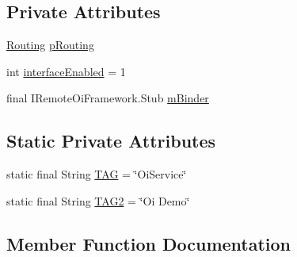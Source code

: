 \subsection*{Private Attributes}
\begin{DoxyCompactItemize}
\item 
\hyperlink{classcom_1_1copelabs_1_1oiframework_1_1router_1_1_routing}{Routing} \hyperlink{classcom_1_1copelabs_1_1oiframework_1_1contentmanager_1_1_content_manager_a15b9d671e7079dd1c471a4b6a331f3e8}{p\+Routing}
\item 
int \hyperlink{classcom_1_1copelabs_1_1oiframework_1_1contentmanager_1_1_content_manager_a804a8e78c97fca907d1752b0176a1a57}{interface\+Enabled} = 1
\item 
final I\+Remote\+Oi\+Framework.\+Stub \hyperlink{classcom_1_1copelabs_1_1oiframework_1_1contentmanager_1_1_content_manager_a530fa8b90c4758fdbad5f0973ea488e8}{m\+Binder}
\end{DoxyCompactItemize}
\subsection*{Static Private Attributes}
\begin{DoxyCompactItemize}
\item 
static final String \hyperlink{classcom_1_1copelabs_1_1oiframework_1_1contentmanager_1_1_content_manager_a5768346882b7f03d78b3e2e09ff482fa}{T\+A\+G} = \char`\"{}Oi\+Service\char`\"{}
\item 
static final String \hyperlink{classcom_1_1copelabs_1_1oiframework_1_1contentmanager_1_1_content_manager_a54253c268f02b62bf5db606859ab7b5b}{T\+A\+G2} = \char`\"{}Oi Demo\char`\"{}
\end{DoxyCompactItemize}


\subsection{Member Function Documentation}
\hypertarget{classcom_1_1copelabs_1_1oiframework_1_1contentmanager_1_1_content_manager_aeffc5e72d64f214dbe1b744b2f2565b9}{}
